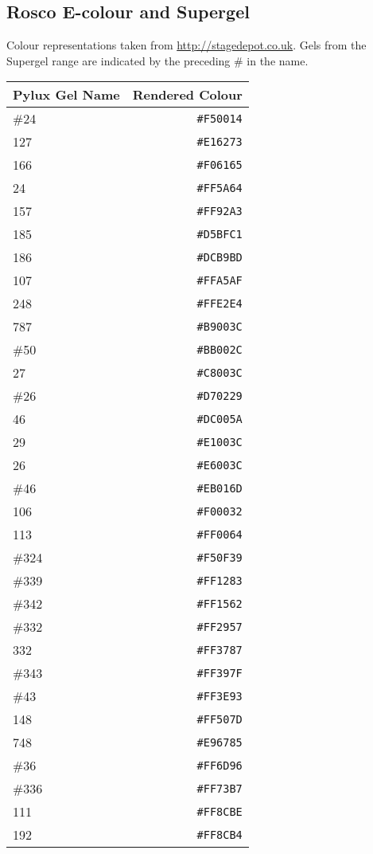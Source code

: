 \documentclass[a4paper]{article}
\begin{document}
\subsection{Rosco E-colour and Supergel}
Colour representations taken from \url{http://stagedepot.co.uk}. Gels from the 
Supergel range are indicated by the preceding \# in the name.
\begin{longtable}{|l|r|}
\hline
Pylux Gel Name & Rendered Colour \\ \hline
\#24 & \texttt{\#F50014} \\
127 & \texttt{\#E16273} \\
166 & \texttt{\#F06165} \\
24 & \texttt{\#FF5A64} \\
157 & \texttt{\#FF92A3} \\
185 & \texttt{\#D5BFC1} \\
186 & \texttt{\#DCB9BD} \\
107 & \texttt{\#FFA5AF} \\
248 & \texttt{\#FFE2E4} \\
787 & \texttt{\#B9003C} \\
\#50 & \texttt{\#BB002C} \\
27 & \texttt{\#C8003C} \\
\#26 & \texttt{\#D70229} \\
46 & \texttt{\#DC005A} \\
29 & \texttt{\#E1003C} \\
26 & \texttt{\#E6003C} \\
\#46 & \texttt{\#EB016D} \\
106 & \texttt{\#F00032} \\
113 & \texttt{\#FF0064} \\
\#324 & \texttt{\#F50F39} \\
\#339 & \texttt{\#FF1283} \\
\#342 & \texttt{\#FF1562} \\
\#332 & \texttt{\#FF2957} \\
332 & \texttt{\#FF3787} \\
\#343 & \texttt{\#FF397F} \\
\#43 & \texttt{\#FF3E93} \\
148 & \texttt{\#FF507D} \\
748 & \texttt{\#E96785} \\
\#36 & \texttt{\#FF6D96} \\
\#336 & \texttt{\#FF73B7} \\
111 & \texttt{\#FF8CBE} \\
192 & \texttt{\#FF8CB4} \\

\end{longtable}
\end{document}
